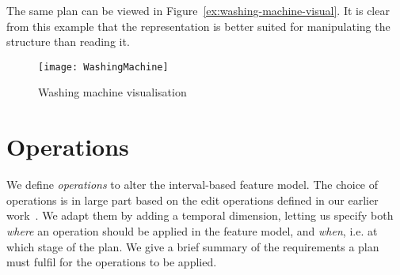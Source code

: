 The same plan can be viewed in Figure~\vref{ex:washing-machine-visual}. It is clear from this example that the representation is better suited for manipulating the structure than reading it. 

\begin{figure}
  \centering
  \texttt{[image: WashingMachine]}
  \caption{Washing machine visualisation}
  \label{ex:washing-machine-visual}
\end{figure}

\section{Operations}
\label{sec:operations}

We define \emph{operations} to alter the interval-based feature model. The choice of operations is in large part based on the edit operations defined in our earlier work~\cite{art:consistency-preserving-evolution-planning}. We adapt them by adding a temporal dimension, letting us specify both \emph{where} an operation should be applied in the feature model, and \emph{when}, i.e. at which stage of the plan. We give a brief summary of the requirements a plan must fulfil for the operations to be applied.

